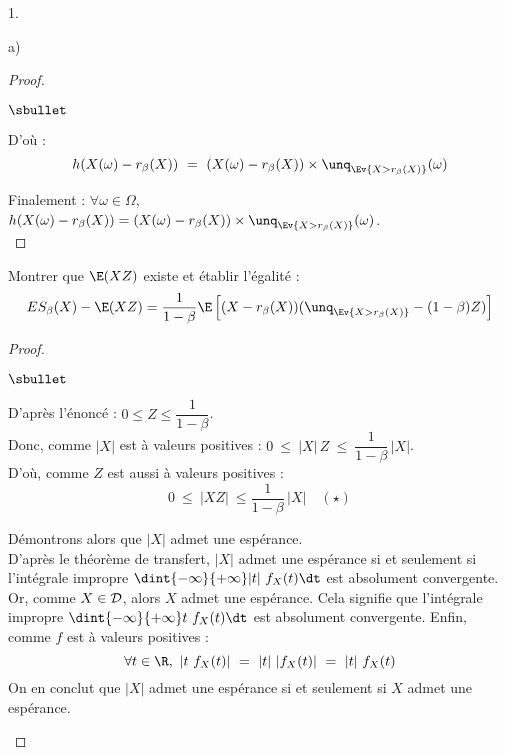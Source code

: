 \documentclass[11pt]{article}%
\begin{document}
\begin{noliste}{1.}
\begin{noliste}{a)}
\begin{proof}
\begin{noliste}{$\sbullet$}
	
	
	
	D'où :
	\[
	  h(X(\omega) - r_\beta(X)) \ = \ (X(\omega) - r_\beta(X))
	  \times \unq_{\Ev{ X> r_\beta(X)}}(\omega)
	\]
      \end{noliste}
      Finalement : $\forall \omega \in \Omega$, $h(X(\omega) - 
      r_\beta(X)) = (X(\omega)- r_\beta(X)) \times \unq_{\Ev{X > 
      r_\beta(X)}}(\omega)$.
      ~\\[-1cm]
    \end{proof}

    
    \item Montrer que $\E(XZ)$ existe et établir l'égalité :
    \[
    ES_\beta(X) -\E(XZ) = \dfrac{1}{1-\beta} \E\left[(X-r_\beta(X))
      (\unq_{\Ev{X > r_\beta(X)}}-(1-\beta)Z)\right]
    \]
    
    \begin{proof}~
      \begin{noliste}{$\sbullet$}
      \item D'après l'énoncé : $0 \leq Z \leq \dfrac{1}{1-\beta}$.\\
        Donc, comme $\vert X \vert$ est à valeurs positives : $ 0 \
        \leq \ \vert X \vert \, Z \ \leq \ \dfrac{1}{1-\beta} \,
	\vert X \vert$.\\
	D'où, comme $Z$ est aussi à valeurs positives :
	\[
	  0 \ \leq \ \vert X Z \vert \ \leq \dfrac{1}{1-\beta} \, \vert 
	  X \vert \quad (\star)
	\]

      \item Démontrons alors que $|X|$ admet une espérance.\\
        D'après le théorème de transfert, $|X|$ admet une espérance si
        et seulement si l'intégrale impropre $\dint{-\infty}{+\infty}
        |t| \ f_X(t) \dt$ est absolument convergente.\\[.2cm]
        Or, comme $X \in {\cal D}$, alors $X$ admet une
        espérance. Cela signifie que l'intégrale impropre
        $\dint{-\infty}{+\infty} t \ f_X(t) \dt$ est absolument
        convergente. Enfin, comme $f$ est à valeurs positives :
        \[
        \forall t \in \R, \ |t \ f_X(t)| \ = \ |t| \ |f_X(t)| \ = \
        |t| \ f_X(t)
        \]
        On en conclut que $|X|$ admet une espérance si et seulement si
        $X$ admet une espérance.%


\end{noliste}
\end{proof}
\end{noliste}
\end{noliste}
\end{document}
